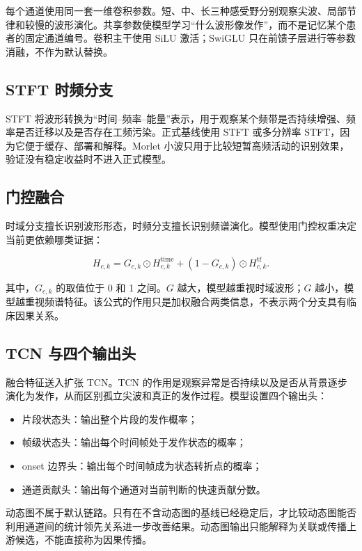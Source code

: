 \documentclass{cumcmthesis_v3}
\numberwithin{figure}{section}
\numberwithin{table}{section}
\begin{document}
每个通道使用同一套一维卷积参数。短、中、长三种感受野分别观察尖波、局部节律和较慢的波形演化。共享参数使模型学习“什么波形像发作”，而不是记忆某个患者的固定通道编号。卷积主干使用 SiLU 激活；SwiGLU 只在前馈子层进行等参数消融，不作为默认替换。

\subsection{STFT 时频分支}

STFT 将波形转换为“时间--频率--能量”表示，用于观察某个频带是否持续增强、频率是否迁移以及是否存在工频污染。正式基线使用 STFT 或多分辨率 STFT，因为它便于缓存、部署和解释。Morlet 小波只用于比较短暂高频活动的识别效果，验证没有稳定收益时不进入正式模型。

\subsection{门控融合}

时域分支擅长识别波形形态，时频分支擅长识别频谱演化。模型使用门控权重决定当前更依赖哪类证据：

\[
H_{c,k}=G_{c,k}\odot H^{\mathrm{time}}_{c,k}
+(1-G_{c,k})\odot H^{\mathrm{tf}}_{c,k}.
\]

其中，$G_{c,k}$ 的取值位于 0 和 1 之间。$G$ 越大，模型越重视时域波形；$G$ 越小，模型越重视频谱特征。该公式的作用只是加权融合两类信息，不表示两个分支具有临床因果关系。

\subsection{TCN 与四个输出头}

融合特征送入扩张 TCN。TCN 的作用是观察异常是否持续以及是否从背景逐步演化为发作，从而区别孤立尖波和真正的发作过程。模型设置四个输出头：

\begin{itemize}[leftmargin=2em,itemsep=0.3em]
\item 片段状态头：输出整个片段的发作概率；
\item 帧级状态头：输出每个时间帧处于发作状态的概率；
\item onset 边界头：输出每个时间帧成为状态转折点的概率；
\item 通道贡献头：输出每个通道对当前判断的快速贡献分数。
\end{itemize}

动态图不属于默认链路。只有在不含动态图的基线已经稳定后，才比较动态图能否利用通道间的统计领先关系进一步改善结果。动态图输出只能解释为关联或传播上游候选，不能直接称为因果传播。
\end{document}
